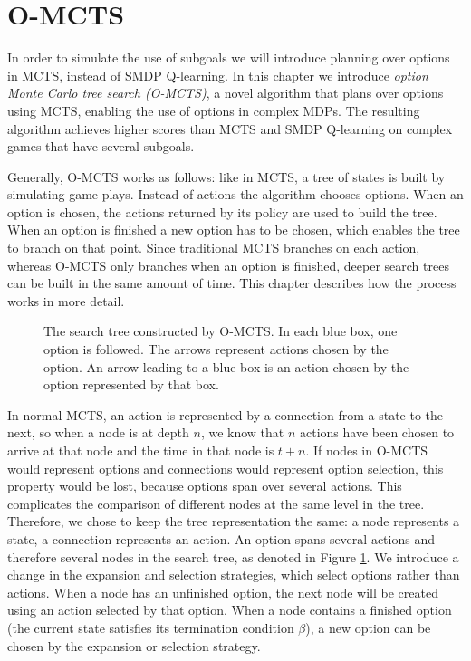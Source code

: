 \section{O-MCTS}
\label{sec:planning}

In order to simulate the use of subgoals we will introduce planning over
options in MCTS, instead of SMDP Q-learning. In this chapter we introduce
\emph{option Monte Carlo tree search (O-MCTS)}, a novel algorithm that plans
over options using MCTS, enabling the use of options in complex MDPs. The
resulting algorithm achieves higher scores than MCTS and SMDP Q-learning on
complex games that have several subgoals.

Generally, O-MCTS works as follows: like in MCTS, a tree of states is
built by simulating game plays. Instead of actions the algorithm chooses
options. When an option is chosen, the actions returned by its policy are used
to build the tree. When an option is finished a new option has to be chosen,
which enables the tree to branch on that point. Since traditional MCTS branches
on each action, whereas O-MCTS only branches when an option is finished, deeper
search trees can be built in the same amount of time. This chapter describes
how the process works in more detail.


\begin{figure}
	\centering
	\caption{The search tree constructed by O-MCTS. In each blue box, one option
	is followed. The arrows represent actions chosen by the option. An arrow
leading to a blue box is an action chosen by the option represented by that box.}
	\label{fig:omcts-tree}
\end{figure}

In normal MCTS, an action is represented by a connection from a state to the
next, so when a node is at depth $n$, we know that $n$ actions have been chosen
to arrive at that node and the time in that node is $t+n$. If nodes in O-MCTS
would represent options and connections would represent option selection, this
property would be lost, because options span over several actions. This
complicates the comparison of different nodes at the same level in the tree.
Therefore, we chose to keep the tree representation the same: a node represents
a state, a connection represents an action. An option spans several actions and
therefore several nodes in the search tree, as denoted in Figure
\ref{fig:omcts-tree}. We introduce a change in the expansion and selection
strategies, which select options rather than actions. When a node has an
unfinished option, the next node will be created using an action selected by
that option. When a node contains a finished option (the current state satisfies
its termination condition $\beta$), a new option can be chosen by the expansion
or selection strategy.


